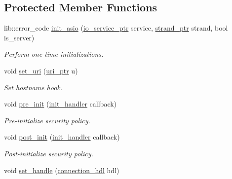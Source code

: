 \subsection*{Protected Member Functions}
\begin{DoxyCompactItemize}
\item 
lib\+::error\+\_\+code \mbox{\hyperlink{classwebsocketpp_1_1transport_1_1asio_1_1tls__socket_1_1connection_a1417198fda5e1fd0043ddfcea23eeae1}{init\+\_\+asio}} (\mbox{\hyperlink{classwebsocketpp_1_1transport_1_1asio_1_1tls__socket_1_1connection_af821cbbeb6df7cdea6348c7d64b00b7a}{io\+\_\+service\+\_\+ptr}} service, \mbox{\hyperlink{classwebsocketpp_1_1transport_1_1asio_1_1tls__socket_1_1connection_aea9f37f95a42ad1a82a4ff0d7977ae37}{strand\+\_\+ptr}} strand, bool is\+\_\+server)
\begin{DoxyCompactList}\small\item\em Perform one time initializations. \end{DoxyCompactList}\item 
void \mbox{\hyperlink{classwebsocketpp_1_1transport_1_1asio_1_1tls__socket_1_1connection_a8cb70301d7d244a72ed1ca90872253ed}{set\+\_\+uri}} (\mbox{\hyperlink{namespacewebsocketpp_aae370ea5ac83a8ece7712cb39fc23f5b}{uri\+\_\+ptr}} u)
\begin{DoxyCompactList}\small\item\em Set hostname hook. \end{DoxyCompactList}\item 
void \mbox{\hyperlink{classwebsocketpp_1_1transport_1_1asio_1_1tls__socket_1_1connection_a1e9487282a1c81169ba3818c640fa578}{pre\+\_\+init}} (\mbox{\hyperlink{namespacewebsocketpp_1_1transport_aeae75e675c1a334b3b33ab7120b480a5}{init\+\_\+handler}} callback)
\begin{DoxyCompactList}\small\item\em Pre-\/initialize security policy. \end{DoxyCompactList}\item 
void \mbox{\hyperlink{classwebsocketpp_1_1transport_1_1asio_1_1tls__socket_1_1connection_aac77e88754c55f2cd67a90adf47fc2f0}{post\+\_\+init}} (\mbox{\hyperlink{namespacewebsocketpp_1_1transport_aeae75e675c1a334b3b33ab7120b480a5}{init\+\_\+handler}} callback)
\begin{DoxyCompactList}\small\item\em Post-\/initialize security policy. \end{DoxyCompactList}\item 
void \mbox{\hyperlink{classwebsocketpp_1_1transport_1_1asio_1_1tls__socket_1_1connection_a24ad10248362f74dc3cce74c79ee5d82}{set\+\_\+handle}} (\mbox{\hyperlink{namespacewebsocketpp_a6b3d26a10ee7229b84b776786332631d}{connection\+\_\+hdl}} hdl)

\end{DoxyCompactItemize}
